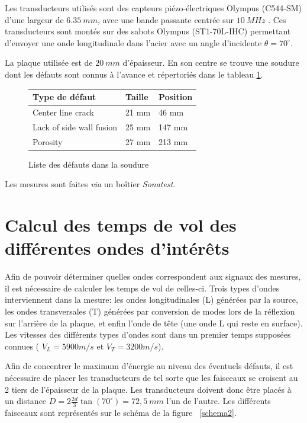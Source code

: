 \documentclass[twoside]{article}
\begin{document}
\begin{multicols}{2}
Les transducteurs utilisés sont des capteurs piézo-électriques Olympus (C544-SM) d'une largeur de $6.35~mm$, avec une bande passante centrée sur $10~MHz$ . Ces transducteurs sont montés sur des sabots Olympus (ST1-70L-IHC) permettant d'envoyer une onde longitudinale dans l'acier avec un angle d'incidente $\theta = 70 ^\circ$.

La plaque utilisée est de $20~mm$ d'épaisseur. En son centre se trouve une soudure dont les défauts sont connus à l'avance et répertoriés dans le tableau \ref{tab1}.\\


\begin{figure}[H]
\centering
\begin{tabular}{l|l|l}
Type de défaut & Taille & Position \\ \hline 
Center line crack & 21 mm& 46 mm\\
Lack of side wall fusion & 25 mm& 147 mm\\
Porosity & 27 mm& 213 mm
\end{tabular}
\caption{\label{tab1} Liste des défauts dans la soudure}
\end{figure}

Les mesures sont faites \textit{via} un boîtier \textit{Sonatest}.


\section{Calcul des temps de vol des différentes ondes d’intérêts}
Afin de pouvoir déterminer quelles ondes correspondent aux signaux des mesures, il est nécessaire de calculer les temps de vol de celles-ci. Trois types d'ondes interviennent dans la mesure: les ondes longitudinales (L) générées par la source, les ondes transversales (T) générées par conversion de modes lors de la réflexion sur l'arrière de la plaque, et enfin l'onde de tête (une onde L qui reste en surface). Les vitesses des différents types d'ondes sont dans un premier temps supposées connues ( $V_L = 5900 m/s$ et $V_T = 3200 m/s$). 

Afin de concentrer le maximum d'énergie au niveau des éventuels défauts, il est nécessaire de placer les transducteurs de tel sorte que les faisceaux se croisent au 2 tiers de l'épaisseur de la plaque. Les transducteurs doivent donc être placés à un distance $D = 2 \frac{2d}{3} \tan(70^\circ)=72,5~mm $ l'un de l'autre. Les différents faisceaux sont représentés sur le schéma de la figure ~\ref{schema2}.


\end{multicols}
\end{document}
